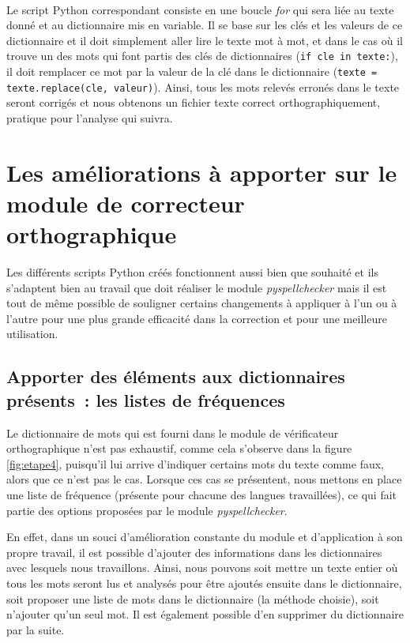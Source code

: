 \paragraph{} Le script Python correspondant consiste en une boucle \textit{for} qui sera liée au texte donné et au dictionnaire mis en variable. Il se base sur les clés et les valeurs de ce dictionnaire et il doit simplement aller lire le texte mot à mot, et dans le cas où il trouve un des mots qui font partis des clés de dictionnaires (\texttt{if cle in texte:}), il doit remplacer ce mot par la valeur de la clé dans le dictionnaire (\texttt{texte = texte.replace(cle, valeur)}). Ainsi, tous les mots relevés erronés dans le texte seront corrigés et nous obtenons un fichier texte correct orthographiquement, pratique pour l'analyse qui suivra.

\section{Les améliorations à apporter sur le module de correcteur orthographique}
Les différents scripts Python créés fonctionnent aussi bien que souhaité et ils s'adaptent bien au travail que doit réaliser le module \emph{pyspellchecker} mais il est tout de même possible de souligner certains changements à appliquer à l'un ou à l'autre pour une plus grande efficacité dans la correction et pour une meilleure utilisation.

\subsection{Apporter des éléments aux dictionnaires présents~: les listes de fréquences}
Le dictionnaire de mots qui est fourni dans le module de vérificateur orthographique n'est pas exhaustif, comme cela s'observe dans la figure \ref{fig:etape4}, puisqu'il lui arrive d'indiquer certains mots du texte comme faux, alors que ce n'est pas le cas. Lorsque ces cas se présentent, nous mettons en place une liste de fréquence (présente pour chacune des langues travaillées), ce qui fait partie des options proposées par le module \emph{pyspellchecker}.

En effet, dans un souci d'amélioration constante du module et d'application à son propre travail, il est possible d'ajouter des informations dans les dictionnaires avec lesquels nous travaillons. Ainsi, nous pouvons soit mettre un texte entier où tous les mots seront lus et analysés pour être ajoutés ensuite dans le dictionnaire, soit proposer une liste de mots dans le dictionnaire (la méthode choisie), soit n'ajouter qu'un seul mot. Il est également possible d'en supprimer du dictionnaire par la suite.

